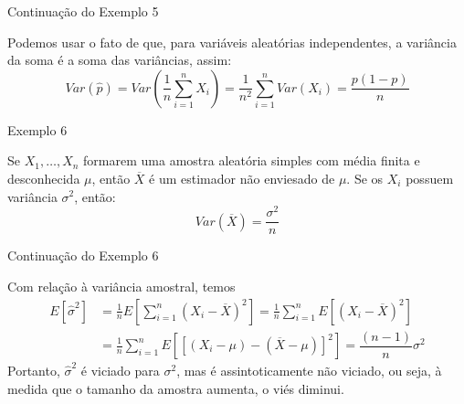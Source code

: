 \documentclass[12pt]{beamer}
\begin{document}
\begin{frame}{Continuação do Exemplo 5}
\begin{block}{}
\justifying
Podemos usar o fato de que, para variáveis aleatórias independentes, a variância da soma é a soma das variâncias, assim:
\begin{equation*}
Var(\hat{p}) = Var\left(\frac{1}{n}\sum_{i=1}^{n} X_i\right) = \frac{1}{n^2}\sum_{i=1}^{n} Var(X_i) = \frac{p(1-p)}{n}
\end{equation*}
\end{block}
\end{frame}

\begin{frame}{Exemplo 6}
\vspace{-0.5cm}
\begin{block}{}
\justifying
Se $X_1, \ldots, X_n$ formarem uma amostra aleatória simples com média finita e desconhecida $\mu$, então $\overline{X}$ é um estimador não enviesado de $\mu$. Se os $X_i$ possuem variância $\sigma^2$, então:
\begin{equation*}
Var(\overline{X}) = \frac{\sigma^2}{n}
\end{equation*}
\end{block}
\end{frame}

\begin{frame}{Continuação do Exemplo 6}
\begin{block}{}
\justifying
Com relação à variância amostral, temos
\begin{align*}
E[\hat{\sigma}^2] &= \frac{1}{n} E\left[\sum_{i=1}^n (X_i - \overline{X})^2\right] = \frac{1}{n} \sum_{i=1}^n E[(X_i - \overline{X})^2] \\
&= \frac{1}{n} \sum_{i=1}^n E\left[\left[(X_i - \mu) - (\overline{X} - \mu)\right]^2\right]=\dfrac{(n-1)}{n}\sigma^{2}
\end{align*}
Portanto, $\hat{\sigma}^2$ é viciado para $\sigma^2$, mas é assintoticamente não viciado, ou seja, à medida que o tamanho da amostra aumenta, o viés diminui.
\end{block}
\end{frame}
\end{document}
